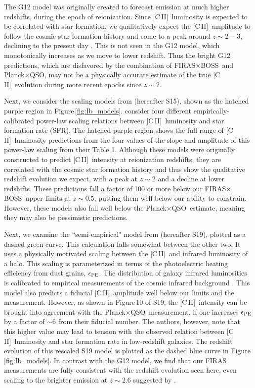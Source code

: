 \documentclass[fleqn,usenatbib]{mnras}
\newcommand{\cii}{[C{\sc\,II}]}
\newcommand{\FB}{FIRAS${\times}$BOSS}
\newcommand{\PB}{Planck${\times}$QSO}
\begin{document}
The G12 model was originally created to forecast emission at much higher redshifts, during the epoch of reionization. Since \cii\ luminosity is expected to be correlated with star formation, we qualitatively expect the \cii\ amplitude to follow the cosmic star formation history and come to a peak around $z\sim2-3$, declining to the present day \citep{Madau2014}.  This is not seen in the G12 model, which monotonically increases as we move to lower redshift.  Thus the bright G12 predictions, which are disfavored by the combination of \FB\ and \PB, may not be a physically accurate estimate of the true \cii\ evolution during more recent epochs since $z{\sim} 2$.

Next, we consider the scaling models from \citet{Silva2015} (hereafter S15), shown as the hatched purple region in Figure\,\ref{fig:Ib_models}.  
\cite{Silva2015} consider four different empirically-calibrated power-law scaling relations between \cii\ luminosity and star formation rate (SFR).  
The hatched purple region shows the full range of \cii\ luminosity predictions from the four values of the slope and amplitude of this power-law scaling from their Table 1. Although these models were originally constructed to predict \cii\ intensity at reionization redshifts, they are correlated with the cosmic star formation history and thus show the qualitative redshift evolution we expect, with a peak at $z\sim2$ and a decline at lower redshifts. 
These predictions fall a factor of 100 or more below our \FB\ upper limits at $z\sim0.5$, putting them well below our ability to constrain.  However, these models also fall well below the \PB\, estimate, meaning they may also be pessimistic predictions.

Next, we examine the ``semi-empirical" model from \citet{Sun2019} (hereafter S19), plotted as a dashed green curve.  This calculation falls somewhat between the other two. It uses a physically motivated scaling between the \cii\ and infrared luminosity of a halo. This scaling is parameterized in terms of the photoelectric heating efficiency from dust grains, $\epsilon_{\rm{PE}}$.  The distribution of galaxy infrared luminosities is calibrated to empirical measurements of the cosmic infrared background \citep{Planck2014}. This model also predicts a fiducial \cii\ amplitude well below our limits and the \citet{yang2019evidence} measurement. However, as shown in Figure\,10 of S19, the \cii\ intensity can be brought into agreement with the \PB\, measurement, if one increases $\epsilon_{\rm{PE}}$ by a factor of ${\sim} 6$ from their fiducial number. The authors, however, note that this higher value may lead to tension with the observed relation between \cii\ luminosity and star formation rate in low-redshift galaxies.
The redshift evolution of this rescaled S19 model is plotted as the dashed blue curve in Figure\,\ref{fig:Ib_models}.  In contrast with the G12 model, we find that our FIRAS measurements are fully consistent with the redshift evolution seen here, even scaling to the brighter emission at $z{\sim}2.6$ suggested by \citet{yang2019evidence}.
\end{document}
